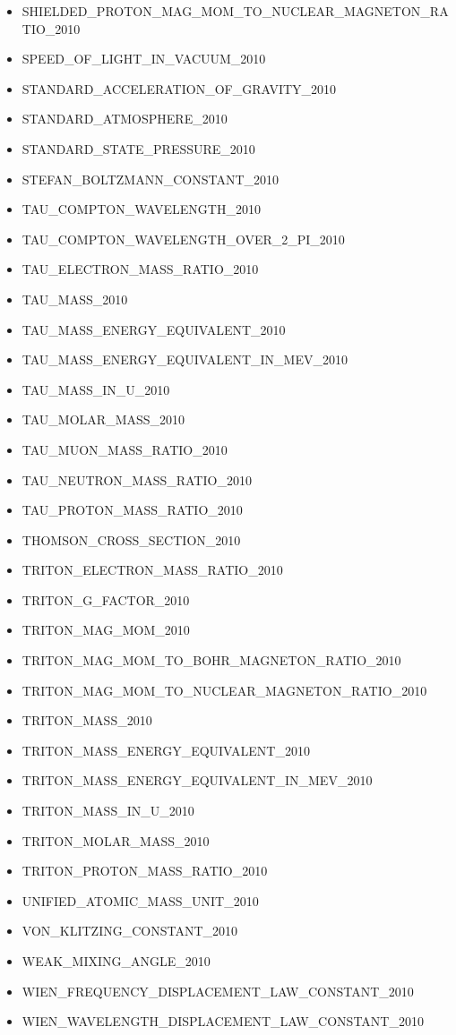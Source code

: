 \begin{itemize}
\item
  SHIELDED\_PROTON\_MAG\_MOM\_TO\_NUCLEAR\_MAGNETON\_RATIO\_2010
\item
  SPEED\_OF\_LIGHT\_IN\_VACUUM\_2010
\item
  STANDARD\_ACCELERATION\_OF\_GRAVITY\_2010
\item
  STANDARD\_ATMOSPHERE\_2010
\item
  STANDARD\_STATE\_PRESSURE\_2010
\item
  STEFAN\_BOLTZMANN\_CONSTANT\_2010
\item
  TAU\_COMPTON\_WAVELENGTH\_2010
\item
  TAU\_COMPTON\_WAVELENGTH\_OVER\_2\_PI\_2010
\item
  TAU\_ELECTRON\_MASS\_RATIO\_2010
\item
  TAU\_MASS\_2010
\item
  TAU\_MASS\_ENERGY\_EQUIVALENT\_2010
\item
  TAU\_MASS\_ENERGY\_EQUIVALENT\_IN\_MEV\_2010
\item
  TAU\_MASS\_IN\_U\_2010
\item
  TAU\_MOLAR\_MASS\_2010
\item
  TAU\_MUON\_MASS\_RATIO\_2010
\item
  TAU\_NEUTRON\_MASS\_RATIO\_2010
\item
  TAU\_PROTON\_MASS\_RATIO\_2010
\item
  THOMSON\_CROSS\_SECTION\_2010
\item
  TRITON\_ELECTRON\_MASS\_RATIO\_2010
\item
  TRITON\_G\_FACTOR\_2010
\item
  TRITON\_MAG\_MOM\_2010
\item
  TRITON\_MAG\_MOM\_TO\_BOHR\_MAGNETON\_RATIO\_2010
\item
  TRITON\_MAG\_MOM\_TO\_NUCLEAR\_MAGNETON\_RATIO\_2010
\item
  TRITON\_MASS\_2010
\item
  TRITON\_MASS\_ENERGY\_EQUIVALENT\_2010
\item
  TRITON\_MASS\_ENERGY\_EQUIVALENT\_IN\_MEV\_2010
\item
  TRITON\_MASS\_IN\_U\_2010
\item
  TRITON\_MOLAR\_MASS\_2010
\item
  TRITON\_PROTON\_MASS\_RATIO\_2010
\item
  UNIFIED\_ATOMIC\_MASS\_UNIT\_2010
\item
  VON\_KLITZING\_CONSTANT\_2010
\item
  WEAK\_MIXING\_ANGLE\_2010
\item
  WIEN\_FREQUENCY\_DISPLACEMENT\_LAW\_CONSTANT\_2010
\item
  WIEN\_WAVELENGTH\_DISPLACEMENT\_LAW\_CONSTANT\_2010
\end{itemize}
